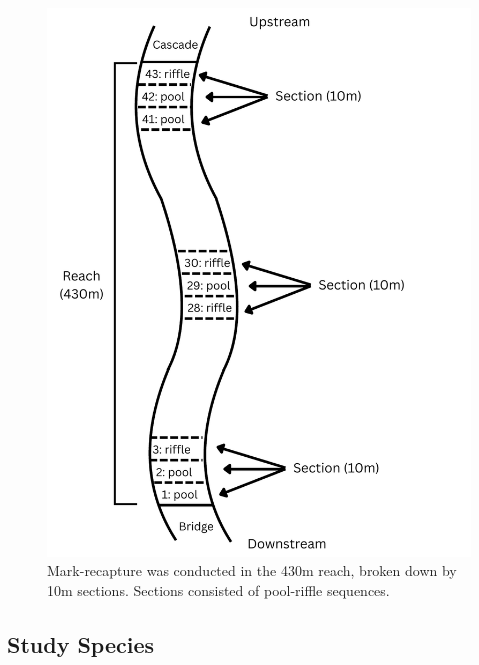 \documentclass[11pt, class=article, crop=false]{standalone}
\begin{document}
\begin{figure}[H]
    \centering
    \includegraphics[width=.5\linewidth]{output/habitat_schematic.pdf}
    \caption[Schematic of the stream reach.]{Mark-recapture was conducted in the 430m reach, broken down by 10m sections. Sections consisted of pool-riffle sequences.}
    \label{habitat_schematic}
\end{figure}

\subsection{Study Species}
\end{document}

